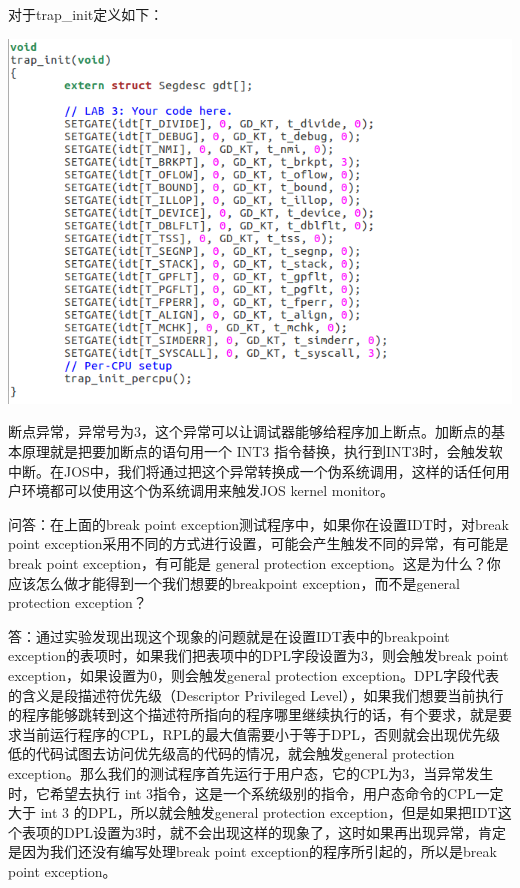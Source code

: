 \begin{ExerciseList}
对于trap\_init定义如下：

\includegraphics[width=6in]{figures/lab2/image63.png}


  断点异常，异常号为3，这个异常可以让调试器能够给程序加上断点。加断点的基本原理就是把要加断点的语句用一个 INT3 指令替换，执行到INT3时，会触发软中断。在JOS中，我们将通过把这个异常转换成一个伪系统调用，这样的话任何用户环境都可以使用这个伪系统调用来触发JOS kernel monitor。

  问答：在上面的break point exception测试程序中，如果你在设置IDT时，对break point exception采用不同的方式进行设置，可能会产生触发不同的异常，有可能是break point exception，有可能是 general protection exception。这是为什么？你应该怎么做才能得到一个我们想要的breakpoint exception，而不是general protection exception？

  答：通过实验发现出现这个现象的问题就是在设置IDT表中的breakpoint exception的表项时，如果我们把表项中的DPL字段设置为3，则会触发break point exception，如果设置为0，则会触发general protection exception。DPL字段代表的含义是段描述符优先级（Descriptor Privileged Level），如果我们想要当前执行的程序能够跳转到这个描述符所指向的程序哪里继续执行的话，有个要求，就是要求当前运行程序的CPL，RPL的最大值需要小于等于DPL，否则就会出现优先级低的代码试图去访问优先级高的代码的情况，就会触发general protection exception。那么我们的测试程序首先运行于用户态，它的CPL为3，当异常发生时，它希望去执行 int 3指令，这是一个系统级别的指令，用户态命令的CPL一定大于 int 3 的DPL，所以就会触发general protection exception，但是如果把IDT这个表项的DPL设置为3时，就不会出现这样的现象了，这时如果再出现异常，肯定是因为我们还没有编写处理break point exception的程序所引起的，所以是break point exception。


\end{ExerciseList}
